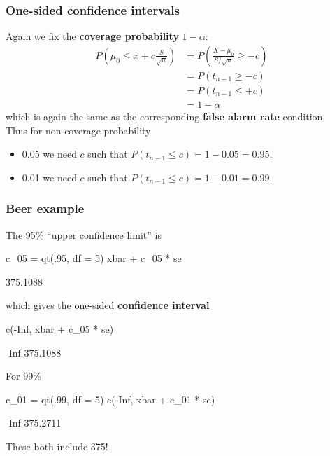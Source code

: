 \documentclass[a4paper]{article}
\begin{document}
\subsubsection{One-sided confidence intervals}
Again we fix the \textcolor{myred}{\textbf{coverage probability}} \(  1-\alpha \):
\begin{align*}
	P \left( \mu_0 \leq \overline{x} + c \frac{S}{\sqrt{n}} \right) &= P \left( \frac{\overline{X} - \mu_0}{S / \sqrt{n}} \geq -c \right)\\
	&= P(t_{n-1} \geq -c)\\
	&= P(t_{n-1} \leq +c)\\
	&= 1-\alpha
\end{align*}
which is again the same as the corresponding \textcolor{mygreen}{\textbf{false alarm rate}} condition.\\
Thus for non-coverage probability
\begin{itemize}
	\item 0.05 we need \( c \) such that \( P(t_{n-1} \leq c) = 1-0.05 = 0.95 \),
	\item 0.01 we need \( c \) such that \( P(t_{n-1} \leq c) = 1-0.01 = 0.99 \).
\end{itemize}
\subsubsection{Beer example}
The 95\% ``upper confidence limit'' is
\begin{Schunk}
\begin{Sinput}
c_05 = qt(.95, df = 5)
xbar + c_05 * se
\end{Sinput}
\begin{Soutput}
[1] 375.1088
\end{Soutput}
\end{Schunk}
which gives the one-sided \textcolor{myred}{\textbf{confidence interval}}
\begin{Schunk}
\begin{Sinput}
c(-Inf, xbar + c_05 * se)
\end{Sinput}
\begin{Soutput}
[1]     -Inf 375.1088
\end{Soutput}
\end{Schunk}
For 99\%
\begin{Schunk}
\begin{Sinput}
c_01 = qt(.99, df = 5)
c(-Inf, xbar + c_01 * se)
\end{Sinput}
\begin{Soutput}
[1]     -Inf 375.2711
\end{Soutput}
\end{Schunk}
These both include 375!
\end{document}
